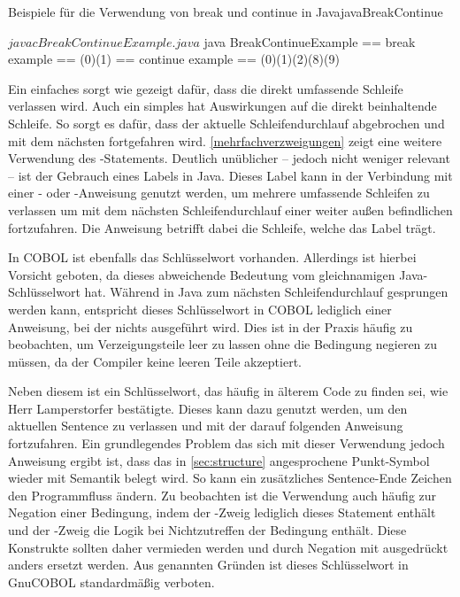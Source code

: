 \begin{codeWithCaption}{Beispiele für die Verwendung von break und continue in Java}{javaBreakContinue}
\begin{shellwindow}
$ javac BreakContinueExample.java 
$ java BreakContinueExample
== break example == 
(0)(1)
== continue example == 
(0)(1)(2)(8)(9)
\end{shellwindow}
\end{codeWithCaption}

Ein einfaches  sorgt wie gezeigt dafür, dass die direkt umfassende Schleife verlassen wird. Auch ein simples  hat Auswirkungen auf die direkt beinhaltende Schleife. So sorgt es dafür, dass der aktuelle Schleifendurchlauf abgebrochen und mit dem nächsten fortgefahren wird. \autoref{mehrfachverzweigungen} zeigt eine weitere Verwendung des -Statements. Deutlich unüblicher -- jedoch nicht weniger relevant -- ist der Gebrauch eines Labels in Java. Dieses Label kann in der Verbindung mit einer - oder -Anweisung genutzt werden, um mehrere umfassende Schleifen zu verlassen \bzw um mit dem nächsten Schleifendurchlauf einer weiter außen befindlichen fortzufahren. Die Anweisung betrifft dabei die Schleife, welche das Label trägt. 

In COBOL ist ebenfalls das Schlüsselwort  vorhanden. Allerdings ist hierbei Vorsicht geboten, da dieses abweichende Bedeutung vom gleichnamigen Java-Schlüsselwort hat. Während in Java zum nächsten Schleifendurchlauf gesprungen werden kann, entspricht dieses Schlüsselwort in COBOL lediglich einer Anweisung, bei der nichts ausgeführt wird. Dies ist in der Praxis häufig zu beobachten, um \zB Verzeigungsteile leer zu lassen ohne die Bedingung negieren zu müssen, da der Compiler keine leeren Teile akzeptiert.

Neben diesem ist  ein Schlüsselwort, das häufig in älterem Code zu finden sei, wie Herr Lamperstorfer bestätigte. Dieses kann dazu genutzt werden, um den aktuellen Sentence zu verlassen und mit der darauf folgenden Anweisung fortzufahren. Ein grundlegendes Problem das sich mit dieser Verwendung jedoch Anweisung ergibt ist, dass das in \autoref{sec:structure} angesprochene Punkt-Symbol wieder mit Semantik belegt wird. So kann ein zusätzliches Sentence-Ende Zeichen den Programmfluss ändern. Zu beobachten ist die Verwendung auch häufig zur Negation einer Bedingung, indem der -Zweig lediglich dieses Statement enthält und der -Zweig die Logik bei Nichtzutreffen der Bedingung enthält. Diese Konstrukte sollten daher vermieden werden und durch Negation mit  ausgedrückt \bzw anders ersetzt werden. Aus genannten Gründen ist dieses Schlüsselwort in GnuCOBOL standardmäßig verboten.

